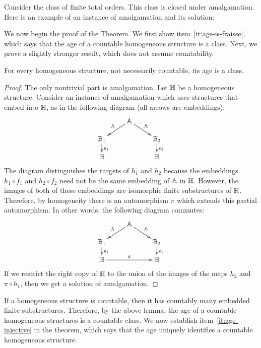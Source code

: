 \begin{myexample}\label{ex:amalgamation-total-orders}
	Consider the class of finite total orders. This class is closed under amalgamation. Here is an example of an instance of amalgamation and its solution:
\end{myexample}


 

We now begin the proof of the \fraisse Theorem. We first show item~\ref{it:age-is-fraisse}, which says that the age of a countable homogeneous structure is a \fraisse class. Next, we prove a slightly stronger result, which does not assume countability.

\begin{lemma}
	For every homogeneous structure, not necessarily countable, its age is a \fraisse class.
\end{lemma}
\begin{proof}
	The only nontrivial part is amalgamation. Let $\mathbb H$ be a homogeneous structure. 
		Consider an instance of amalgamation which uses structures that embed into $\mathbb H$, as in the following diagram (all arrows are embeddings):
		\begin{align*}
			\vcenter{\xymatrix @R=1pc {
			& \structa\ar[dl]_{f_1}\ar[dr]^{f_2} \\
			\structb_1\ar[d]^{h_1} & & \structb_2\ar[d]^{h_2}\\
			\structh & & \structh
			}}	
		\end{align*}
		The diagram distinguishes the targets of $h_1$ and $h_2$ because the embeddings $h_1 \circ f_1$ and $h_2 \circ f_2$ need not be the same embedding of $\mathbb A$ in $\mathbb H$. However, the images of both of these embeddings are isomorphic  finite substructures of $\mathbb H$. Therefore, by homogeneity there is an automorphism $\pi$ which extends this partial automorphism. In other words, the following diagram commutes:
		\begin{align*}
			\vcenter{\xymatrix @R=1pc {
			& \structa\ar[dl]_{f_1}\ar[dr]^{f_2} \\
			\structb_1\ar[d]^{h_1} & & \structb_2\ar[d]^{h_2}\\
			\structh \ar[rr]^\pi & & \structh
			}}	
		\end{align*}
		If we restrict the right copy of $\mathbb H$ to the union of the  images of the maps $h_2$ and $\pi \circ h_1$, then we get a solution of amalgamation.
\end{proof}

If a homogeneous structure is countable, then it has countably many embedded finite substructures. Therefore, by the above lemma, the age of a countable homogeneous structures is a countable \fraisse class. 
We now establish item~\ref{it:age-injective} in the theorem, which says that the age uniquely identifies a countable homogeneous structure.

